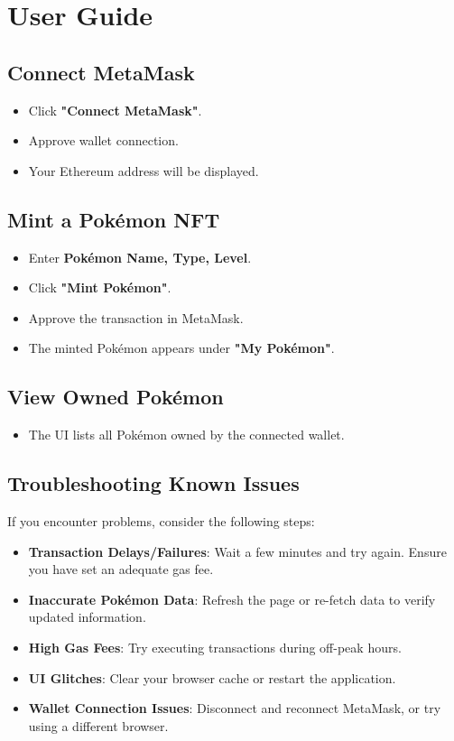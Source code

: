 \documentclass{article}
\begin{document}
\section{User Guide}
\subsection{Connect MetaMask}
\begin{itemize}
    \item Click \textbf{"Connect MetaMask"}.
    \item Approve wallet connection.
    \item Your Ethereum address will be displayed.
\end{itemize}

\subsection{Mint a Pokémon NFT}
\begin{itemize}
    \item Enter \textbf{Pokémon Name, Type, Level}.
    \item Click \textbf{"Mint Pokémon"}.
    \item Approve the transaction in MetaMask.
    \item The minted Pokémon appears under \textbf{"My Pokémon"}.
\end{itemize}

\subsection{View Owned Pokémon}
\begin{itemize}
    \item The UI lists all Pokémon owned by the connected wallet.
\end{itemize}

\subsection{Troubleshooting Known Issues}
If you encounter problems, consider the following steps:
\begin{itemize}
    \item \textbf{Transaction Delays/Failures}: Wait a few minutes and try again. Ensure you have set an adequate gas fee.
    \item \textbf{Inaccurate Pokémon Data}: Refresh the page or re-fetch data to verify updated information.
    \item \textbf{High Gas Fees}: Try executing transactions during off-peak hours.
    \item \textbf{UI Glitches}: Clear your browser cache or restart the application.
    \item \textbf{Wallet Connection Issues}: Disconnect and reconnect MetaMask, or try using a different browser.
\end{itemize}
\end{document}
